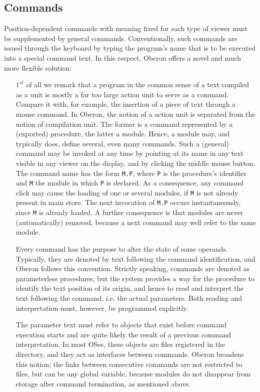 \subsection{Commands}
Position-dependent commands with meaning fixed for each type of viewer must be supplemented
by general commands. Conventionally, such commands are issued through the keyboard by
typing the program's name that is to be executed into a special command text. In this
respect, Oberon offers a novel and much more flexible solution:
\begin{itemize}
  \item[$1^{st}$] of all we remark that a program in the common sense of a text compiled
as a unit is mostly a far too large action unit to serve as a command. Compare it with,
for example, the insertion of a piece of text through a mouse command. In Oberon, the
notion of a action unit is separated from the notion of compilation unit. The former is a
command represented by a (exported) procedure, the latter a module. Hence, a module may,
and typically does, define several, even many commands. Such a (general) command may be
invoked at any time by pointing at its name in any text visible in any viewer on the display,
and by clicking the middle mouse button. The command name has the form \verb|M.P|, where
\verb|P| is the procedure's identifier and \verb|M| the module in which \verb|P| is declared.
As a consequence, any command click may cause the loading of one or several modules, if
\verb|M| is not already present in main store. The next invocation of \verb|M.P| occurs
instantaneously, since \verb|M| is already loaded. A further consequence is that modules
are never (automatically) removed, because a next command may well refer to the same module.

Every command has the purpose to alter the state of some operands. Typically, they are
denoted by text following the command identification, and Oberon follows this convention.
Strictly speaking, commands are denoted as parameterless procedures; but the system
provides a way for the procedure to identify the text position of its origin, and hence
to read and interpret the text following the command, i.e. the actual parameters. Both
reading and interpretation must, however, be programmed explicitly.

The parameter text must refer to objects that exist before command execution starts and
are quite likely the result of a previous command interpretation. In most OSes, these
objects are files registered in the directory, and they act as interfaces between commands.
Oberon broadens this notion; the links between consecutive commands are not restricted to
files, but can be any global variable, because modules do not disappear from storage
after command termination, as mentioned above.


\end{itemize}
